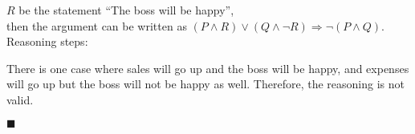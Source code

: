 \documentclass{report}
\newcommand{\qed}{\ \\\strut\hfill$\blacksquare$\vspace{1em}}
\begin{document}
\begin{enumerate}[leftmargin=*]
\begin{enumerate}
                        $R$ be the statement ``The boss will be happy'',\\

                        then the argument can be written as $(P \wedge R) \vee (Q \wedge \neg R)
                              \Rightarrow \neg(P \wedge Q)$.\\

                        Reasoning steps:

                        There is one case where sales will go up and the boss will be happy, and
                        expenses will go up but the boss will not be happy as well. Therefore, the
                        reasoning is not valid. \qed
            \end{enumerate}
\end{enumerate}
\end{document}
